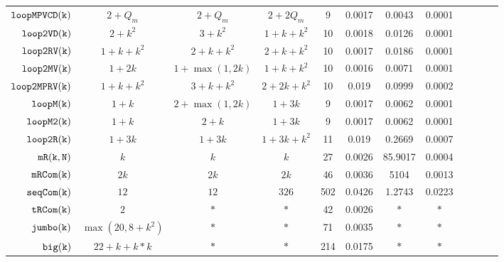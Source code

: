 {\begin {table}[H]
\begin{center}
{\begin{tabular}{| >{\tiny}r | c | c | c | c | c | c | c | c | c | c | c }
         $ {\mathtt{loopMPVCD(k)}}$ & $2+Q_m$ &  $2 + Q_m$  & $2+2Q_m$   &   9 & 0.0017 & 0.0043  & 0.0001 \\
         $  \mathtt{loop2VD(k)}$ & $2 + k^2$ &   $3 + k^2$ & $1 + k + k^2 $   &  10 & 0.0018 & 0.0126  & 0.0001  \\
         $  \mathtt{loop2RV(k)}$ & $1 + k +  k^2$ &  
         $ 2 + k +  k^2 $ 
         &  $2 + k + k^2$   &  10 & 0.0017 & 0.0186  & 0.0001  \\
         $  \mathtt{loop2MV(k)}$ & $1 + 2k $ & $1 + \max(1,2k) $ &  $1 + k + k^2 $  & 10 & 0.0016 & 0.0071  & 0.0001 \\
         $ \mathtt{loop2MPRV(k)}$ & $1 + k + k^2$ &  $3 + k + k^2  $ &  $2 + 2k + k^2  $  &  10 & 0.019 & 0.0999  & 0.0002 \\
         {$ \mathtt{loopM(k)}$} & $1 + k$ &  $ 2 + \max(1,2k) $ & $1 + 3k  $  &  9 & 0.0017 & 0.0062  & 0.0001  \\
         {$ \mathtt{loopM2(k)}$} & $1 + k$ &  $ 2 + k $ & $1 + 3k  $  &  9 & 0.0017 & 0.0062  & 0.0001  \\
         {$\mathtt{loop2R(k)}$} & $1 + 3k$ &  $1 + 3k $ &  $1 + 3k  + k^2$  &  11 & 0.019 & 0.2669  & 0.0007 \\
         $  \mathtt{mR(k, N)}$ & $k$ & $ k   $ & $k $   &  27 & 0.0026 & 85.9017  & 0.0004 \\
         $  \mathtt{mRCom(k)}$ & $2k$ & $  2k $ & $ 2k $   &  46 & 0.0036 & 5104  &  0.0013\\
         $  \mathtt{seqCom(k)}$ & $12$ & $12  $  & $326 $  &  502 & 0.0426  & 1.2743  & 0.0223 \\
         $  \mathtt{tRCom(k)}$ & $2$ &  $ * $ & $*  $  &  42 & 0.0026 & $*$  & $*$\\
         $  \mathtt{{jumbo(k)}}$ & $ \max(20, 8+k^2)$ &  $ * $   &   $* $  &  71 & 0.0035 & $*$ &  $*$ \\
         $  {\mathtt{big(k)}} $ & $22+k+k*k$ &  $* $ &  $* $  &  214 & 0.0175 & $*$ & $*$ \\
         \hline \hline
        \end{tabular}
}
\end{center}
\vspace{-0.5cm}
\end{table}
}


